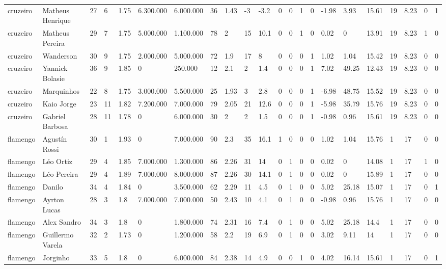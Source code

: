 \begin{longtable}{llllllllllllllllllllll}
cruzeiro & Matheus Henrique & 27 & 6 & 1.75 & 6.300.000 & 6.000.000 & 36 & 1.43 & -3 & -3.2 & 0 & 0 & 1 & 0 & -1.98 & 3.93 & 15.61 & 19 & 8.23 & 0 & 1 \\
cruzeiro & Matheus Pereira & 29 & 7 & 1.75 & 5.000.000 & 1.100.000 & 78 & 2 & 15 & 10.1 & 0 & 0 & 1 & 0 & 0.02 & 0 & 13.91 & 19 & 8.23 & 1 & 0 \\
cruzeiro & Wanderson & 30 & 9 & 1.75 & 2.000.000 & 5.000.000 & 72 & 1.9 & 17 & 8 & 0 & 0 & 0 & 1 & 1.02 & 1.04 & 15.42 & 19 & 8.23 & 0 & 0 \\
cruzeiro & Yannick Bolasie & 36 & 9 & 1.85 & 0 & 250.000 & 12 & 2.1 & 2 & 1.4 & 0 & 0 & 0 & 1 & 7.02 & 49.25 & 12.43 & 19 & 8.23 & 0 & 0 \\
cruzeiro & Marquinhos & 22 & 8 & 1.75 & 3.000.000 & 5.500.000 & 25 & 1.93 & 3 & 2.8 & 0 & 0 & 0 & 1 & -6.98 & 48.75 & 15.52 & 19 & 8.23 & 0 & 0 \\
cruzeiro & Kaio Jorge & 23 & 11 & 1.82 & 7.200.000 & 7.000.000 & 79 & 2.05 & 21 & 12.6 & 0 & 0 & 0 & 1 & -5.98 & 35.79 & 15.76 & 19 & 8.23 & 0 & 0 \\
cruzeiro & Gabriel Barbosa & 28 & 11 & 1.78 & 0 & 6.000.000 & 30 & 2 & 2 & 1.5 & 0 & 0 & 0 & 1 & -0.98 & 0.96 & 15.61 & 19 & 8.23 & 0 & 0 \\
flamengo & Agustín Rossi & 30 & 1 & 1.93 & 0 & 7.000.000 & 90 & 2.3 & 35 & 16.1 & 1 & 0 & 0 & 0 & 1.02 & 1.04 & 15.76 & 1 & 17 & 0 & 0 \\
flamengo & Léo Ortiz & 29 & 4 & 1.85 & 7.000.000 & 1.300.000 & 86 & 2.26 & 31 & 14 & 0 & 1 & 0 & 0 & 0.02 & 0 & 14.08 & 1 & 17 & 1 & 0 \\
flamengo & Léo Pereira & 29 & 4 & 1.89 & 7.000.000 & 8.000.000 & 87 & 2.26 & 30 & 14.1 & 0 & 1 & 0 & 0 & 0.02 & 0 & 15.89 & 1 & 17 & 0 & 0 \\
flamengo & Danilo & 34 & 4 & 1.84 & 0 & 3.500.000 & 62 & 2.29 & 11 & 4.5 & 0 & 1 & 0 & 0 & 5.02 & 25.18 & 15.07 & 1 & 17 & 0 & 1 \\
flamengo & Ayrton Lucas & 28 & 3 & 1.8 & 7.000.000 & 7.000.000 & 50 & 2.43 & 10 & 4.1 & 0 & 1 & 0 & 0 & -0.98 & 0.96 & 15.76 & 1 & 17 & 0 & 0 \\
flamengo & Alex Sandro & 34 & 3 & 1.8 & 0 & 1.800.000 & 74 & 2.31 & 16 & 7.4 & 0 & 1 & 0 & 0 & 5.02 & 25.18 & 14.4 & 1 & 17 & 0 & 0 \\
flamengo & Guillermo Varela & 32 & 2 & 1.73 & 0 & 1.200.000 & 58 & 2.2 & 19 & 6.9 & 0 & 1 & 0 & 0 & 3.02 & 9.11 & 14 & 1 & 17 & 0 & 0 \\
flamengo & Jorginho & 33 & 5 & 1.8 & 0 & 6.000.000 & 84 & 2.38 & 14 & 4.9 & 0 & 0 & 1 & 0 & 4.02 & 16.14 & 15.61 & 1 & 17 & 0 & 1 \\

\end{longtable}
